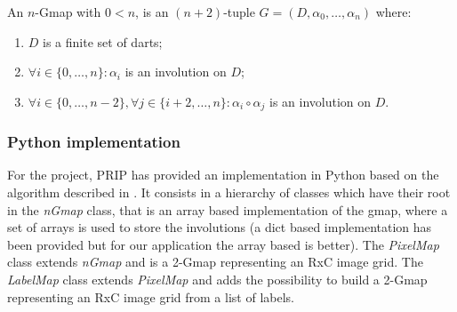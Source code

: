 \begin{definition}[$n$-Gmap]
    An $n$-Gmap with $0<n$, is an $(n+2)$-tuple $G=(D,\alpha_0,\ldots,\alpha_{n})$ where:
    \begin{enumerate}
        \item $D$ is a finite set of darts;
        \item $\forall i\in\{0,\ldots,n\}:\alpha_i$ is an involution on $D$;
        \item $\forall i\in\{0,\ldots,n-2\},\forall j\in\{i+2,\ldots,n\}:
        \alpha_i \circ \alpha_j$ is an involution on $D$.
    \end{enumerate}
    \label{definition:gmap}
\end{definition}

\subsubsection{Python implementation}

For the project, PRIP has provided an implementation in Python based on the algorithm 
described in \cite{Lienhardt}. It consists in a hierarchy of classes which have their
root in the \textit{nGmap} class, that is an array based implementation of the
gmap, where a set of arrays is used to store the involutions (a dict based
implementation has been provided but for our application the array based is
better). The \textit{PixelMap} class extends \textit{nGmap} and is a 2-Gmap representing 
an RxC image grid. The \textit{LabelMap} class extends \textit{PixelMap} and adds the 
possibility to build a 2-Gmap representing an RxC image grid from a list of labels.
